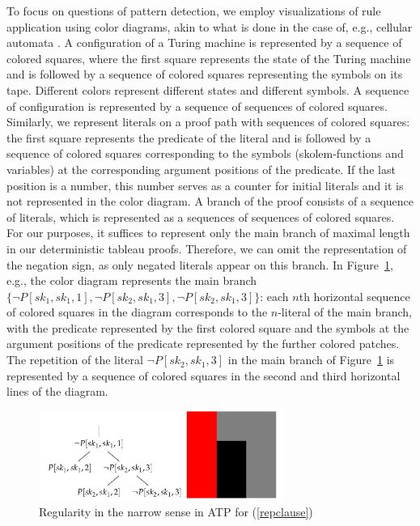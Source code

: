 \documentclass[%
  manuscript=article,   %
  year=2024,
  volume=77,
  doi=10.59203/zfn.77.694,
]{zfn}
\begin{document}
To focus on questions of pattern detection, we employ visualizations of rule application using color diagrams, akin to what is done in the case of, e.g., cellular automata \parencite[cf.][]{Wolfram}. 
A configuration of a Turing machine is represented by a sequence of colored squares, where the first square represents the state of the Turing machine and is followed by a sequence of colored squares representing the symbols on its tape. Different colors represent different states and different symbols. A sequence of configuration is represented by a sequence of sequences of colored squares. Similarly, we represent literals on a proof path with sequences of colored squares: the first square represents \label{colordia} the predicate of the literal and is followed by a sequence of colored squares corresponding to the symbols (skolem-functions and variables) at the corresponding argument positions of the predicate. If the last position is a number, this number serves as a counter for initial literals and it is not represented in the color diagram. A branch of the proof consists of a sequence of literals, which is represented as a sequences of sequences of colored squares. For our purposes, it suffices to represent only the main branch of maximal length in our deterministic tableau proofs. Therefore, we can omit the representation of the negation sign, as only negated literals appear on this branch. In Figure~\ref{rep}, e.g., the color diagram represents the main branch $\{\neg P[sk_1,sk_1,1], \neg P[sk_2,sk_1,3], \neg P[sk_2,sk_1,3]\}$: each $n$th horizontal sequence 
of colored squares in the diagram corresponds to the $n$-literal of the main branch, with the predicate represented by the first colored square and the symbols at the argument positions of the predicate represented by the further colored patches. The repetition of the literal $\neg P[sk_2,sk_1,3]$ in the main branch of Figure~\ref{rep} is represented by a sequence of colored squares in the second and third horizontal lines of the diagram.


\begin{figure}[ht]
\begin{center}
\includegraphics[width=8cm]{ART_Lampert/fig1.png}
\end{center}
\caption{Regularity in the narrow sense in ATP for (\ref{repclause})}
    \label{rep}
\end{figure}
\end{document}
